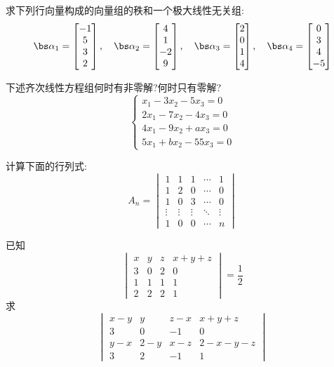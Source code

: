 \documentclass{ctexart}
\begin{document}
\pagestyle{empty}
\begin{center}
\end{center}
\begin{homework}[1]
    求下列行向量构成的向量组的秩和一个极大线性无关组:
    \[\bs\alpha_1=\begin{bmatrix}
        -1\\5\\3\\2
    \end{bmatrix},\quad\bs\alpha_2=\begin{bmatrix}
        4\\1\\-2\\9
    \end{bmatrix},\quad\bs\alpha_3=\begin{bmatrix}
        2\\0\\1\\4
    \end{bmatrix},\quad\bs\alpha_4=\begin{bmatrix}
        0\\3\\4\\-5
    \end{bmatrix}\]
\end{homework}
\begin{homework}[2]
    下述齐次线性方程组何时有非零解?何时只有零解?
    \[\left\{\begin{array}{l}
        x_1-3x_2-5x_3=0\\
        2x_1-7x_2-4x_3=0\\
        4x_1-9x_2+ax_3=0\\
        5x_1+bx_2-55x_3=0
    \end{array}\right.\]
\end{homework}
\begin{homework}[3]
    计算下面的行列式:
    \[A_n=\begin{vmatrix}
        1&1&1&\cdots&1\\
        1&2&0&\cdots&0\\
        1&0&3&\cdots&0\\
        \vdots&\vdots&\vdots&\ddots&\vdots\\
        1&0&0&\cdots&n
    \end{vmatrix}\]
\end{homework}
\begin{homework}[4]
    已知
    \[\begin{vmatrix}
        x&y&z&x+y+z\\
        3&0&2&0\\
        1&1&1&1\\
        2&2&2&1
    \end{vmatrix}=\dfrac12\]
    求
    \[\begin{vmatrix}
        x-y&y&z-x&x+y+z\\
        3&0&-1&0\\
        y-x&2-y&x-z&2-x-y-z\\
        3&2&-1&1
    \end{vmatrix}\]
\end{homework}
\end{document}
